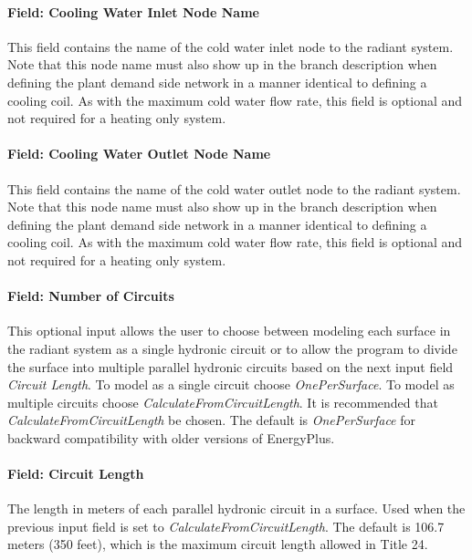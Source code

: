 \paragraph{Field: Cooling Water Inlet Node Name}\label{field-cooling-water-inlet-node-name-000}

This field contains the name of the cold water inlet node to the radiant system. Note that this node name must also show up in the branch description when defining the plant demand side network in a manner identical to defining a cooling coil. As with the maximum cold water flow rate, this field is optional and not required for a heating only system.

\paragraph{Field: Cooling Water Outlet Node Name}\label{field-cooling-water-outlet-node-name-000}

This field contains the name of the cold water outlet node to the radiant system. Note that this node name must also show up in the branch description when defining the plant demand side network in a manner identical to defining a cooling coil. As with the maximum cold water flow rate, this field is optional and not required for a heating only system.

\paragraph{Field: Number of Circuits}\label{field-number-of-circuits}

This optional input allows the user to choose between modeling each surface in the radiant system as a single hydronic circuit or to allow the program to divide the surface into multiple parallel hydronic circuits based on the next input field \emph{Circuit Length}. To model as a single circuit choose \emph{OnePerSurface}. To model as multiple circuits choose \emph{CalculateFromCircuitLength}. It is recommended that \emph{CalculateFromCircuitLength} be chosen. The default is \emph{OnePerSurface} for backward compatibility with older versions of EnergyPlus.

\paragraph{Field: Circuit Length}\label{field-circuit-length}

The length in meters of each parallel hydronic circuit in a surface. Used when the previous input field is set to \emph{CalculateFromCircuitLength}. The default is 106.7 meters (350 feet), which is the maximum circuit length allowed in Title 24.

